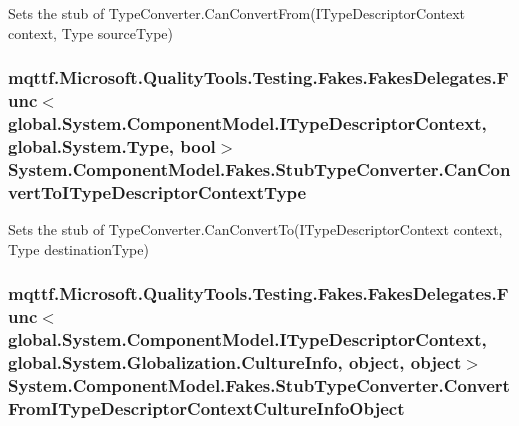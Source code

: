 Sets the stub of Type\-Converter.\-Can\-Convert\-From(\-I\-Type\-Descriptor\-Context context, Type source\-Type)

\hypertarget{class_system_1_1_component_model_1_1_fakes_1_1_stub_type_converter_acba1cffa8ee50cf2db4d91f2d30793e5}{
\subsubsection[{Can\-Convert\-To\-I\-Type\-Descriptor\-Context\-Type}]{\setlength{\rightskip}{0pt plus 5cm}mqttf.\-Microsoft.\-Quality\-Tools.\-Testing.\-Fakes.\-Fakes\-Delegates.\-Func$<$global.\-System.\-Component\-Model.\-I\-Type\-Descriptor\-Context, global.\-System.\-Type, bool$>$ System.\-Component\-Model.\-Fakes.\-Stub\-Type\-Converter.\-Can\-Convert\-To\-I\-Type\-Descriptor\-Context\-Type}}\label{class_system_1_1_component_model_1_1_fakes_1_1_stub_type_converter_acba1cffa8ee50cf2db4d91f2d30793e5}


Sets the stub of Type\-Converter.\-Can\-Convert\-To(\-I\-Type\-Descriptor\-Context context, Type destination\-Type)

\hypertarget{class_system_1_1_component_model_1_1_fakes_1_1_stub_type_converter_a7cfca08ed27ea9e332c251b3211f1b63}{
\subsubsection[{Convert\-From\-I\-Type\-Descriptor\-Context\-Culture\-Info\-Object}]{\setlength{\rightskip}{0pt plus 5cm}mqttf.\-Microsoft.\-Quality\-Tools.\-Testing.\-Fakes.\-Fakes\-Delegates.\-Func$<$global.\-System.\-Component\-Model.\-I\-Type\-Descriptor\-Context, global.\-System.\-Globalization.\-Culture\-Info, object, object$>$ System.\-Component\-Model.\-Fakes.\-Stub\-Type\-Converter.\-Convert\-From\-I\-Type\-Descriptor\-Context\-Culture\-Info\-Object}}\label{class_system_1_1_component_model_1_1_fakes_1_1_stub_type_converter_a7cfca08ed27ea9e332c251b3211f1b63}


